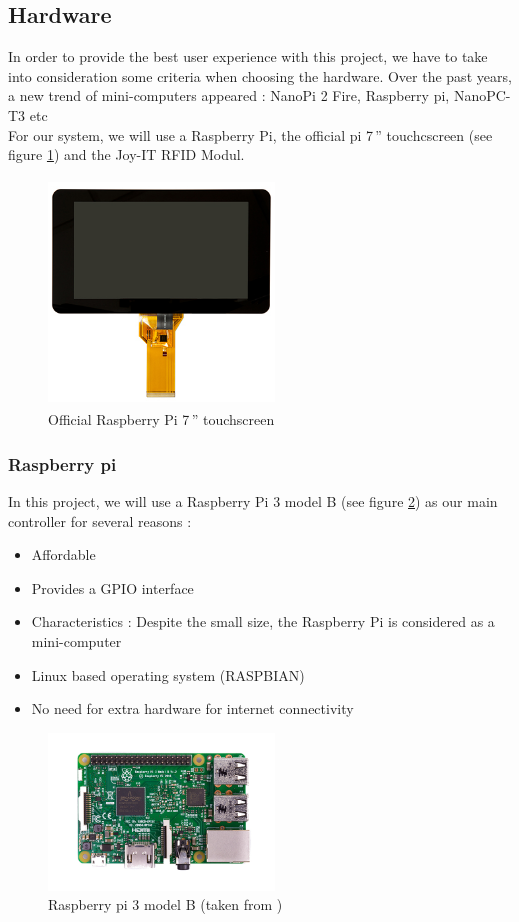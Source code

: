 \documentclass[12pt]{article}
\begin{document}
  \subsection{Hardware}
  In order to provide the best user experience with this project, we have to take into consideration some criteria when choosing the hardware.
  Over the past years, a new trend of mini-computers appeared : NanoPi 2 Fire, Raspberry pi, NanoPC-T3 etc \\
  For our system, we will use a Raspberry Pi, the official pi 7\,'' touchcscreen (see figure \ref{fig:touchscreen}) and the Joy-IT RFID Modul.
   \begin{figure}[H]
   \centering
   \includegraphics[width=6cm, height=6cm]{./images/touchscreen}
   \captionsetup{justification=centering}
   \caption{Official Raspberry Pi 7\,'' touchscreen \cite{touchScreen}}
   \label{fig:touchscreen}
  \end{figure}
  
  \subsubsection{Raspberry pi}
   In this project, we will use a Raspberry Pi 3 model B (see figure \ref{fig:raspberry}) as our main controller for several reasons :
   \begin{itemize}
  \item Affordable
  \item Provides a GPIO interface
  \item Characteristics : Despite the small size, the Raspberry Pi is considered as a mini-computer
  \item Linux based operating system (RASPBIAN)
  \item No need for extra hardware for internet connectivity
  \end{itemize}
  
   \begin{figure}[H]
   \centering
   \includegraphics[width=6cm]{./images/raspberry}
   \captionsetup{justification=centering}
   \caption{Raspberry pi 3 model B (taken from \cite{raspberryPi3})}
   \label{fig:raspberry}
  \end{figure}
  
\end{document}
